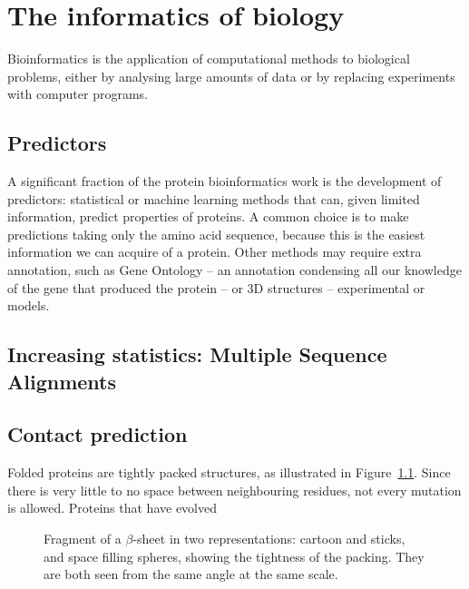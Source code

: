 \chapter{The informatics of biology}
Bioinformatics is the application of computational methods to biological problems,
either by analysing large amounts of data or by replacing experiments with computer programs.

\section{Predictors}
A significant fraction of the protein bioinformatics work is the development of predictors: statistical or machine learning methods that can, given limited information, predict properties of proteins.
A common choice is to make predictions taking only the amino acid sequence, because this is the easiest information we can acquire of a protein.
Other methods may require extra annotation, such as Gene Ontology -- an annotation condensing all our knowledge of the gene that produced the protein -- or 3D structures -- experimental or models.

\section[Multiple Sequence Alignments]{Increasing statistics: Multiple Sequence Alignments}

\section{Contact prediction}
Folded proteins are tightly packed structures, as illustrated in Figure~\ref{fig:packing}.
Since there is very little to no space between neighbouring residues, not every mutation is allowed.
Proteins that have evolved 


\begin{figure}[!hb]
	\centering
	\hfil
	\hfil
	\hfil
	\caption{Fragment of a $\beta$-sheet in two representations: cartoon and sticks, and space filling spheres, showing the tightness of the packing.
	They are both seen from the same angle at the same scale.}\label{fig:packing}
\end{figure}

